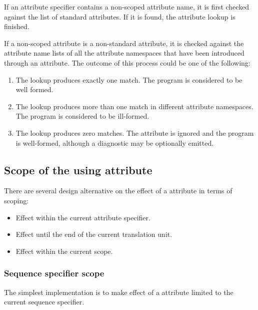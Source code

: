 If an attribute specifier contains a non-scoped attribute name, it is
first checked against the list of standard attributes. If it is found,
the attribute lookup is finished.

If a non-scoped attribute is a non-standard attribute, it is checked
against the attribute name lists of all the attribute namespaces that have been
introduced through an  attribute. The outcome of this process
could be one of the following:

\begin{enumerate}

\item The lookup produces exactly one match. The program is considered
to be well formed.

\item The lookup produces more than one match in different attribute namespaces.
The program is considered to be ill-formed.

\item The lookup produces zero matches. The attribute is ignored and the
program is well-formed, although a diagnostic may be optionally emitted.

\end{enumerate}

\subsection{Scope of the using attribute}

There are several design alternative on the effect of a 
attribute in terms of scoping:

\begin{itemize}

\item Effect within the current attribute specifier.
\item Effect until the end of the current translation unit.
\item Effect within the current scope.

\end{itemize}

\subsubsection{Sequence specifier scope}

The simplest implementation is to make effect of a  attribute
limited to the current sequence specifier.

